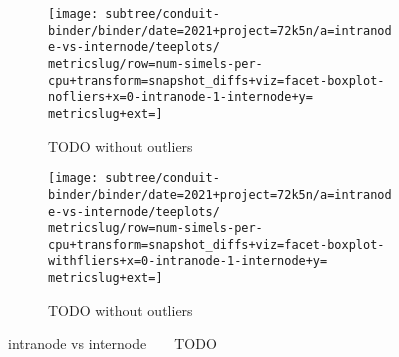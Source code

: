 \begin{figure*}
  \centering
  \begin{subfigure}[b]{0.5\textwidth}
    \centering
    \texttt{[image: subtree/conduit-binder/binder/date=2021+project=72k5n/a=intranode-vs-internode/teeplots/\\metricslug/row=num-simels-per-cpu+transform=snapshot\_diffs+viz=facet-boxplot-nofliers+x=0-intranode-1-internode+y=\\metricslug+ext=]}
    \caption{TODO without outliers}
    \label{fig:intranode-vs-internode-distribution-\metricslug-nofliers}
  \end{subfigure}%
  \begin{subfigure}[b]{0.5\textwidth}
    \centering
    \texttt{[image: subtree/conduit-binder/binder/date=2021+project=72k5n/a=intranode-vs-internode/teeplots/\\metricslug/row=num-simels-per-cpu+transform=snapshot\_diffs+viz=facet-boxplot-withfliers+x=0-intranode-1-internode+y=\\metricslug+ext=]}
    \caption{TODO without outliers}
    \label{fig:intranode-vs-internode-distribution-\metricslug-withfliers}
  \end{subfigure}
  \caption{intranode vs internode ~ \metric ~ TODO}
  \label{fig:intranode-vs-internode-distribution-\metricslug}
\end{figure*}
